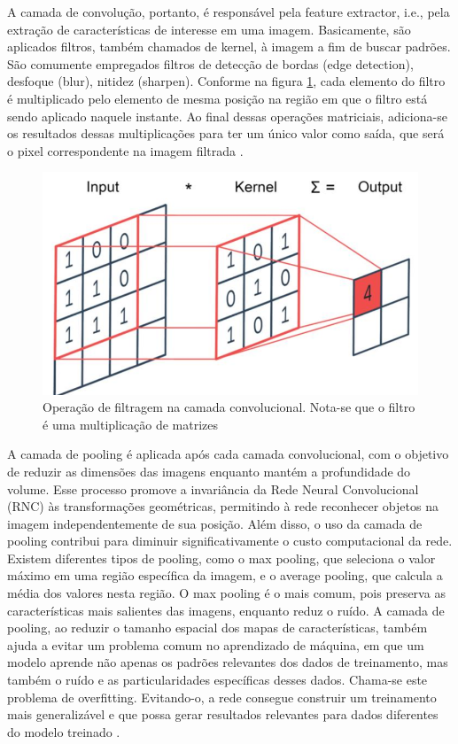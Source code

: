 A camada de convolução, portanto, é responsável pela feature extractor, i.e., pela extração de características de interesse em uma imagem. Basicamente, são aplicados filtros, também chamados de kernel, à imagem a fim de buscar padrões. São comumente empregados filtros de detecção de bordas (edge detection), desfoque (blur), nitidez (sharpen). Conforme na figura \ref{fig:kernel}, cada elemento do filtro é multiplicado pelo elemento de mesma posição na região em que o filtro está sendo aplicado naquele instante. Ao final dessas operações matriciais, adiciona-se os resultados dessas multiplicações para ter um único valor como saída, que será o pixel correspondente na imagem filtrada \cite{rodrigues2023visao} . 

\begin{figure}[!h]
    \center
    \begin{minipage}{0.9\linewidth}
    \center
    \captionsetup{justification=centering,margin=0.5cm,font=small}
    \includegraphics[width=0.7\linewidth]{img/cap2/filtro.png}
    \caption{ Operação de filtragem na camada convolucional. Nota-se que o filtro é uma multiplicação de matrizes \cite{shorthistory}} 
    \label{fig:kernel}
    \end{minipage}
\end{figure}

A camada de pooling é aplicada após cada camada convolucional, com o objetivo de reduzir as dimensões das imagens enquanto mantém a profundidade do volume. Esse processo promove a invariância da Rede Neural Convolucional (RNC) às transformações geométricas, permitindo à rede reconhecer objetos na imagem independentemente de sua posição. Além disso, o uso da camada de pooling contribui para diminuir significativamente o custo computacional da rede. Existem diferentes tipos de pooling, como o max pooling, que seleciona o valor máximo em uma região específica da imagem, e o average pooling, que calcula a média dos valores nesta região. O max pooling é o mais comum, pois preserva as características mais salientes das imagens, enquanto reduz o ruído. A camada de pooling, ao reduzir o tamanho espacial dos mapas de características, também ajuda a evitar um problema comum no aprendizado de máquina, em que um modelo aprende não apenas os padrões relevantes dos dados de treinamento, mas também o ruído e as particularidades específicas desses dados. Chama-se este problema de overfitting. Evitando-o, a rede consegue construir um treinamento mais generalizável e que possa gerar resultados relevantes para dados diferentes do modelo treinado \cite{lima2020captcha}.

